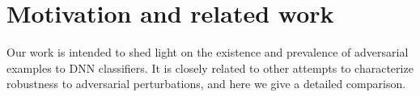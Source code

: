 \section{Motivation and related work}

Our work is intended to shed light on the existence and prevalence of adversarial examples to DNN classifiers. It is closely related to other attempts to characterize robustness to adversarial perturbations, and here we give a detailed comparison.











